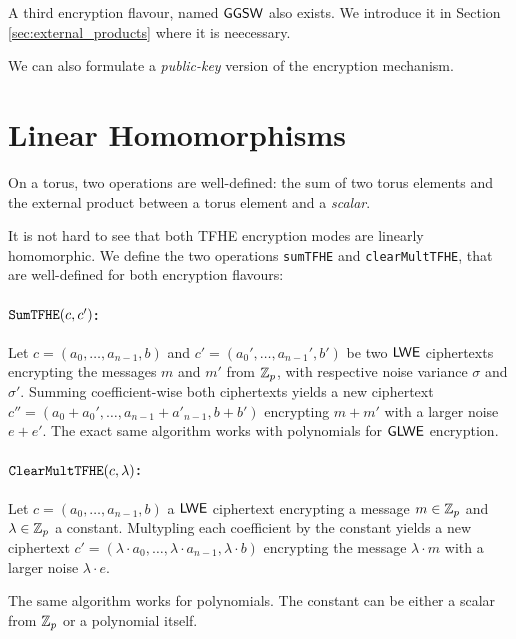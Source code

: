 A third encryption flavour, named $\textsf{GGSW}$ also exists. We introduce it in Section \ref{sec:external_products} where it is neecessary.


We can also formulate a \textit{public-key} version of the encryption mechanism. 



\section{Linear Homomorphisms}

On a torus, two operations are well-defined: the sum of two torus elements and the external product between a torus element and a \textit{scalar}.

It is not hard to see that both TFHE encryption modes are linearly homomorphic. We define the two operations \texttt{sumTFHE} and \texttt{clearMultTFHE}, that are well-defined for both encryption flavours:


\paragraph{$\texttt{SumTFHE}(c, c')$:} Let $c = (a_0, \dots, a_{n-1}, b)$ and $c' = (a_0', \dots, a_{n-1}', b')$ be two $\textsf{LWE}$ ciphertexts encrypting the messages $m$ and $m'$ from $\mathbb{Z}_p$, with respective noise variance $\sigma$ and $\sigma'$. Summing coefficient-wise both ciphertexts yields a new ciphertext $c'' = (a_0 + a_0', \dots, a_{n-1} + a'_{n-1}, b + b')$ encrypting $m + m'$ with a larger noise $e + e'$. The exact same algorithm works with polynomials for $\textsf{GLWE}$ encryption. 


\paragraph{$\texttt{ClearMultTFHE}(c, \lambda)$:} Let $c = (a_0, \dots, a_{n-1}, b)$ a $\textsf{LWE}$ ciphertext encrypting a message $m \in \mathbb{Z}_p$ and $\lambda \in \mathbb{Z}_p$ a constant. Multypling each coefficient by the constant yields a new ciphertext $c' = (\lambda \cdot a_0, \dots, \lambda \cdot a_{n-1}, \lambda \cdot b)$ encrypting the message $\lambda \cdot m$ with a larger noise $\lambda \cdot e$.

The same algorithm works for polynomials. The constant can be either a scalar from $\mathbb{Z}_p$ or a polynomial itself.




